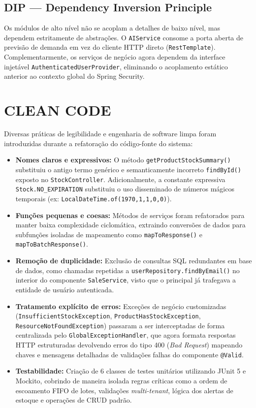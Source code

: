 \documentclass[12pt,a4paper]{article}
\begin{document}
\subsection{DIP — Dependency Inversion Principle}
Os módulos de alto nível não se acoplam a detalhes de baixo nível, mas dependem estritamente de abstrações. O \texttt{AIService} consome a porta aberta de previsão de demanda em vez do cliente HTTP direto (\texttt{RestTemplate}). Complementarmente, os serviços de negócio agora dependem da interface injetável \texttt{AuthenticatedUserProvider}, eliminando o acoplamento estático anterior ao contexto global do Spring Security.

\newpage
\section{CLEAN CODE}

Diversas práticas de legibilidade e engenharia de software limpa foram introduzidas durante a refatoração do código-fonte do sistema:
\begin{itemize}
    \item \textbf{Nomes claros e expressivos:} O método \texttt{getProductStockSummary()} substituiu o antigo termo genérico e semanticamente incorreto \texttt{findById()} exposto no \texttt{StockController}. Adicionalmente, a constante expressiva \texttt{Stock.NO\_EXPIRATION} substituiu o uso disseminado de números mágicos temporais (ex: \texttt{LocalDateTime.of(1970,1,1,0,0)}).
    \item \textbf{Funções pequenas e coesas:} Métodos de serviços foram refatorados para manter baixa complexidade ciclomática, extraindo conversões de dados para subfunções isoladas de mapeamento como \texttt{mapToResponse()} e \texttt{mapToBatchResponse()}.
    \item \textbf{Remoção de duplicidade:} Exclusão de consultas SQL redundantes em base de dados, como chamadas repetidas a \texttt{userRepository.findByEmail()} no interior do componente \texttt{SaleService}, visto que o principal já trafegava a entidade de usuário autenticada.
    \item \textbf{Tratamento explícito de erros:} Exceções de negócio customizadas (\texttt{InsufficientStockException}, \texttt{ProductHasStockException}, \texttt{ResourceNotFoundException}) passaram a ser interceptadas de forma centralizada pelo \texttt{GlobalExceptionHandler}, que agora formata respostas HTTP estruturadas devolvendo erros do tipo 400 (\textit{Bad Request}) mapeando chaves e mensagens detalhadas de validações falhas do componente \texttt{@Valid}.
    \item \textbf{Testabilidade:} Criação de 6 classes de testes unitários utilizando JUnit 5 e Mockito, cobrindo de maneira isolada regras críticas como a ordem de escoamento FIFO de lotes, validações \textit{multi-tenant}, lógica dos alertas de estoque e operações de CRUD padrão.
\end{itemize}
\end{document}
